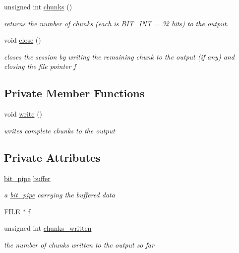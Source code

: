 \begin{DoxyCompactItemize}
unsigned int \hyperlink{classobitstream_ae835de27953b678b5b4ce5b33033d529}{chunks} ()
\begin{DoxyCompactList}\small\item\em returns the number of chunks (each is B\+I\+T\+\_\+\+I\+NT = 32 bits) to the output. \end{DoxyCompactList}\item 
void \hyperlink{classobitstream_a6d76dbba302e1181fbc9609072a4c2a0}{close} ()
\begin{DoxyCompactList}\small\item\em closes the session by writing the remaining chunk to the output (if any) and closing the file pointer f \end{DoxyCompactList}\end{DoxyCompactItemize}
\subsection*{Private Member Functions}
\begin{DoxyCompactItemize}
\item 
void \hyperlink{classobitstream_a5ac23633932baad040856f0a33ee1ebf}{write} ()
\begin{DoxyCompactList}\small\item\em writes complete chunks to the output \end{DoxyCompactList}\end{DoxyCompactItemize}
\subsection*{Private Attributes}
\begin{DoxyCompactItemize}
\item 
\hyperlink{classbit__pipe}{bit\+\_\+pipe} \hyperlink{classobitstream_aeaccad00a395a404aa16472bfa052be3}{buffer}
\begin{DoxyCompactList}\small\item\em a \hyperlink{classbit__pipe}{bit\+\_\+pipe} carrying the buffered data \end{DoxyCompactList}\item 
F\+I\+LE $\ast$ \hyperlink{classobitstream_ac589d74745217748c888ae777ab324a7}{f}
\item 
unsigned int \hyperlink{classobitstream_a3022397f2b6133ea5990016d9d078a2f}{chunks\+\_\+written}
\begin{DoxyCompactList}\small\item\em the number of chunks written to the output so far \end{DoxyCompactList}\end{DoxyCompactItemize}


